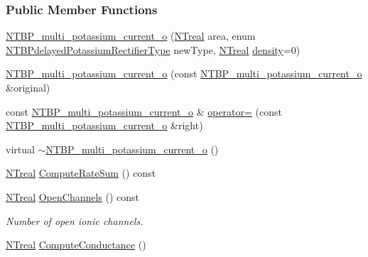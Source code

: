 \subsubsection*{Public Member Functions}
\begin{DoxyCompactItemize}
\item 
\hyperlink{class_n_t_b_p__multi__potassium__current__o_a867c59273fc817ab6720f1e9cd76d680}{NTBP\_\-multi\_\-potassium\_\-current\_\-o} (\hyperlink{nt__types_8h_a814a97893e9deb1eedcc7604529ba80d}{NTreal} area, enum \hyperlink{ntbp__object__obj_8h_aeeceaef81d00b84a44823ba078e4fcd3}{NTBPdelayedPotassiumRectifierType} newType, \hyperlink{nt__types_8h_a814a97893e9deb1eedcc7604529ba80d}{NTreal} \hyperlink{class_n_t_b_p__multi__current__o_a82138baaa276b09c13038ca1fd6f08a7}{density}=0)
\item 
\hyperlink{class_n_t_b_p__multi__potassium__current__o_ae10e9d441a0fb954274cc4b296813e40}{NTBP\_\-multi\_\-potassium\_\-current\_\-o} (const \hyperlink{class_n_t_b_p__multi__potassium__current__o}{NTBP\_\-multi\_\-potassium\_\-current\_\-o} \&original)
\item 
const \hyperlink{class_n_t_b_p__multi__potassium__current__o}{NTBP\_\-multi\_\-potassium\_\-current\_\-o} \& \hyperlink{class_n_t_b_p__multi__potassium__current__o_a80fe0f17388646dd58471b833453cba5}{operator=} (const \hyperlink{class_n_t_b_p__multi__potassium__current__o}{NTBP\_\-multi\_\-potassium\_\-current\_\-o} \&right)
\item 
virtual \hyperlink{class_n_t_b_p__multi__potassium__current__o_a9080fcf89494656ebd035d1f76cf8588}{$\sim$NTBP\_\-multi\_\-potassium\_\-current\_\-o} ()
\item 
\hyperlink{nt__types_8h_a814a97893e9deb1eedcc7604529ba80d}{NTreal} \hyperlink{class_n_t_b_p__multi__potassium__current__o_a31c52bf7c339e5411bb0efbc57faee98}{ComputeRateSum} () const 
\item 
\hyperlink{nt__types_8h_a814a97893e9deb1eedcc7604529ba80d}{NTreal} \hyperlink{class_n_t_b_p__multi__potassium__current__o_ab9b2a9a39c00cde50c5d5417105a6236}{OpenChannels} () const 
\begin{DoxyCompactList}\small\item\em Number of open ionic channels. \item\end{DoxyCompactList}\item 
\hyperlink{nt__types_8h_a814a97893e9deb1eedcc7604529ba80d}{NTreal} \hyperlink{class_n_t_b_p__multi__potassium__current__o_ac959106a593bd671bd061b433670fa42}{ComputeConductance} ()

\end{DoxyCompactItemize}
